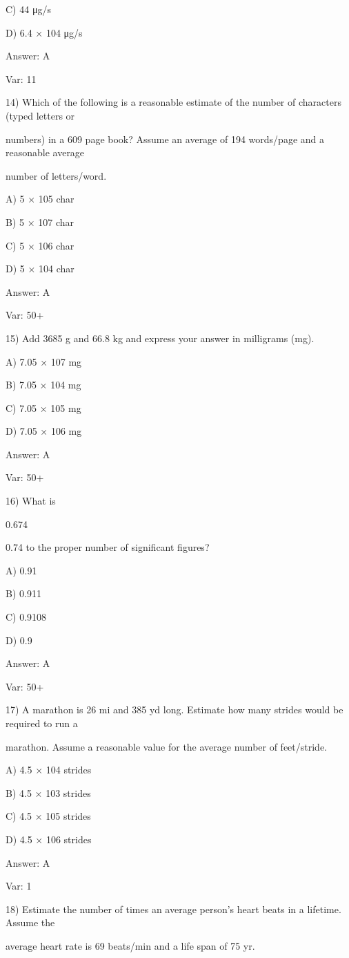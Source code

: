 C) 44 μg/s

D) 6.4 × 104 μg/s

Answer: A

Var: 11

14) Which of the following is a reasonable estimate of the number of characters (typed letters or

numbers) in a 609 page book? Assume an average of 194 words/page and a reasonable average

number of letters/word.

A) 5 × 105 char

B) 5 × 107 char

C) 5 × 106 char

D) 5 × 104 char

Answer: A

Var: 50+

15) Add 3685 g and 66.8 kg and express your answer in milligrams (mg).

A) 7.05 × 107 mg

B) 7.05 × 104 mg

C) 7.05 × 105 mg

D) 7.05 × 106 mg

Answer: A

Var: 50+

16) What is

0.674

0.74 to the proper number of significant figures?

A) 0.91

B) 0.911

C) 0.9108

D) 0.9

Answer: A

Var: 50+

17) A marathon is 26 mi and 385 yd long. Estimate how many strides would be required to run a

marathon. Assume a reasonable value for the average number of feet/stride.

A) 4.5 × 104 strides

B) 4.5 × 103 strides

C) 4.5 × 105 strides

D) 4.5 × 106 strides

Answer: A

Var: 1

18) Estimate the number of times an average person's heart beats in a lifetime. Assume the

average heart rate is 69 beats/min and a life span of 75 yr.

